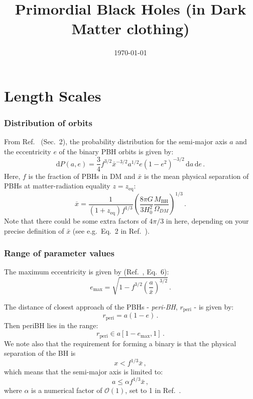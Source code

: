 \documentclass[a4paper,11pt]{article}
\newcommand{\rperi}{r_\mathrm{peri}}
\begin{document}
\title{Primordial Black Holes (in Dark Matter clothing)}
\date{\today}
\maketitle

\section{Length Scales}

\subsubsection*{Distribution of orbits}

From Ref.~\cite{Sasaki:2016jop} (Sec.~2), the probability distribution for the semi-major axis $a$ and the eccentricity $e$ of the binary PBH orbits is given by:
\begin{equation}
\mathrm{d}P(a,e) = \frac{3}{4} f^{3/2} \bar{x}^{-3/2} a^{1/2} e (1-e^2)^{-3/2}\,\mathrm{d}a\,\mathrm{d}e\,.
\end{equation}
Here, $f$ is the fraction of PBHs in DM and $\bar{x}$ is the mean physical separation of PBHs at matter-radiation equality $z = z_\mathrm{eq}$:
\begin{equation}
\overline{x} = \frac{1}{(1+z_\mathrm{eq}) f^{1/3}} \left(\frac{8\pi G}{3 H_0^2} \frac{M_\mathrm{BH}}{\Omega_{DM}}\right)^{1/3}\,.
\end{equation}
Note that there could be some extra factors of $4\pi/3$ in here, depending on your precise definition of $\bar{x}$ (see e.g.~Eq.~2 in Ref.~\cite{Ali-Haimoud:2017rtz}).


\subsubsection*{Range of parameter values}

The maximum eccentricity is given by (Ref.~\cite{Sasaki:2016jop}, Eq.~6):
\begin{equation}
e_\mathrm{max} = \sqrt{1 - f^{3/2} \left(\frac{a}{\bar{x}}\right)^{3/2}}\,.
\end{equation}

The distance of closest approach of the PBHs - \textit{peri-BH}, $r_\mathrm{peri}$ - is given by:
\begin{equation}
r_\mathrm{peri} = a (1-e)\,.
\end{equation}
Then periBH lies in the range:
\begin{equation}
\rperi \in a[1 - e_\mathrm{max}, 1]\,.
\end{equation}
We note also that the requirement for forming a binary is that the physical separation of the BH is
\begin{equation}
x < f^{1/3} \bar{x}\,,
\end{equation}
which means that the semi-major axis is limited to:
\begin{equation}
a \leq \alpha f^{1/3} \bar{x}\,,
\end{equation}
where $\alpha$ is a numerical factor of $\mathcal{O}(1)$, set to 1 in Ref.~\cite{Sasaki:2016jop}.
\end{document}
